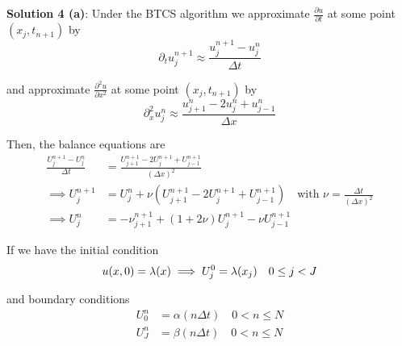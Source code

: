 \documentclass[12pt]{article}
\begin{document}
{\bf Solution 4 (a)}: Under the BTCS algorithm we approximate $\frac{\partial u}{\partial t}$ at some point $(x_j, t_{n + 1})$ by
\begin{equation*}
	\partial_t u^{n + 1}_j \approx \frac{u^{n + 1}_j - u^n_j}{\Delta t} 
\end{equation*}

and approximate $\frac{\partial^2 u}{\partial x^2}$ at some point $(x_j, t_{n + 1})$ by
\begin{equation*}
	\partial^2_x u^{n}_j \approx \frac{u^n_{j + 1} - 2u^n_j + u^n_{j - 1}}{\Delta x} 
\end{equation*}

Then, the balance equations are
\begin{align*}
	\frac{U^{n + 1}_j - U^n_j}{\Delta t} &= \frac{U^{n + 1}_{j + 1} - 2U^{n + 1}_j + U^{n + 1}_{j - 1}}{(\Delta x)^2} \\
\implies U^{n + 1}_j &= U^n_j + \nu \left( U^{n + 1}_{j + 1} - 2U^{n + 1}_j + U^{n + 1}_{j - 1} \right) \quad \text{with } \nu = \frac{\Delta t}{(\Delta x)^2} \\
\implies U^n_j &= -\nu^{n + 1}_{j + 1} + (1 + 2\nu)U^{n + 1}_j - \nu U^{n + 1}_{j - 1}
\end{align*}

If we have the initial condition 
\begin{equation*}
	u(x, 0) = \lambda(x) \implies U^0_j = \lambda(x_j) \quad 0 \leq j < J \\
\end{equation*}

and boundary conditions
\begin{align*}
	U^n_0 &= \alpha(n\Delta t) \quad 0 < n \leq N \\
	U^n_J &= \beta(n\Delta t) \quad 0 < n \leq N
\end{align*}
\end{document}
